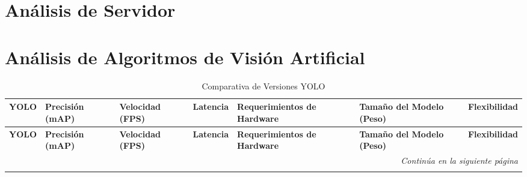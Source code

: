 \section{Análisis de Servidor}
\section{Análisis de Algoritmos de Visión Artificial}

\renewcommand{\arraystretch}{1.5}
\begin{longtable}{|p{1.8cm}|p{2cm}|p{2cm}|p{1.8cm}|p{3cm}|p{2cm}|p{2.3cm}|}
\caption{Comparativa de Versiones YOLO} \label{tab:comparativa_yolo} \\

\hline
\textbf{YOLO} & \textbf{Precisión (mAP)} & \textbf{Velocidad (FPS)} & \textbf{Latencia} & \textbf{Requerimientos de Hardware} & \textbf{Tamaño del Modelo (Peso)} & \textbf{Flexibilidad} \\
\hline
\endfirsthead

\hline
\textbf{YOLO} & \textbf{Precisión (mAP)} & \textbf{Velocidad (FPS)} & \textbf{Latencia} & \textbf{Requerimientos de Hardware} & \textbf{Tamaño del Modelo (Peso)} & \textbf{Flexibilidad} \\
\hline
\endhead

\hline
\multicolumn{7}{r}{\textit{Continúa en la siguiente página}} \\
\endfoot

\hline
\endlastfoot


\end{longtable}
